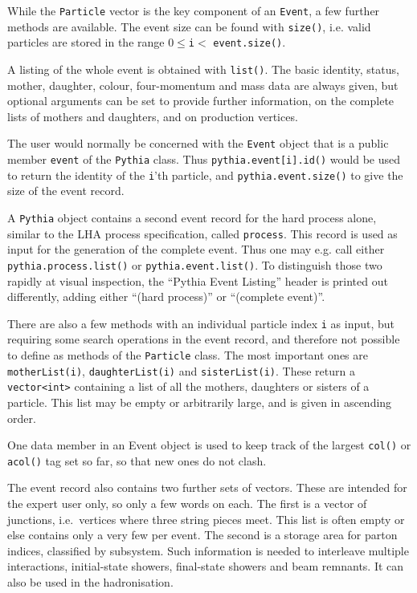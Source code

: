 \documentclass{elsartmod}
\begin{document}
While the \texttt{Particle} vector is the key component of an 
\texttt{Event}, a few further methods are available. 
The event size can be found with \texttt{size()}, i.e. valid particles 
are stored in the range $0 \leq $\texttt{i}$ <$ \texttt{event.size()}. 

A listing of the whole event is obtained with \texttt{list()}. The 
basic identity, status, mother, daughter, colour, four-momentum and 
mass data are always given, but optional arguments can be set to provide 
further information, on the complete lists of mothers and daughters, 
and on production vertices.

The user would normally be concerned with the \texttt{Event} object that 
is a public member \texttt{event} of the \texttt{Pythia} class. Thus 
\texttt{pythia.event[i].id()} would be used to return the identity of 
the \texttt{i}'th particle, and \texttt{pythia.event.size()} to give 
the size of the event record. 

A \texttt{Pythia} object contains a second event record for the 
hard process alone, similar to the LHA process specification, 
called \texttt{process}. This record is used as input for the 
generation of the complete event. Thus one may e.g. call either 
\texttt{pythia.process.list()} or \texttt{pythia.event.list()}. To 
distinguish those two rapidly at visual inspection, the 
``Pythia Event Listing'' header is printed out differently, adding
either ``(hard process)'' or ``(complete event)''.

There are also a few methods with an individual particle index 
\texttt{i} as input, but requiring some search operations in the 
event record, and therefore not possible to define as methods of 
the \texttt{Particle} class. The most important ones are
\texttt{motherList(i)}, \texttt{daughterList(i)} and
\texttt{sisterList(i)}. These return a \texttt{vector<int>} containing 
a list of all the mothers, daughters or sisters of a particle. This 
list may be empty or arbitrarily large, and is given in ascending order.

One data member in an Event object is used to keep track of the  
largest \texttt{col()} or \texttt{acol()} tag set so far, so that new 
ones do not clash. 

The event record also contains two further sets of vectors. These are
intended for the expert user only, so only a few words on each.
The first is a vector of junctions, i.e.\ vertices where three string
pieces meet. This list is often empty or else contains only a very few 
per event. The second is a storage area for parton indices, classified 
by subsystem. Such information is needed to interleave multiple 
interactions, initial-state showers, final-state showers and beam 
remnants. It can also be used in the hadronisation. 
\end{document}

